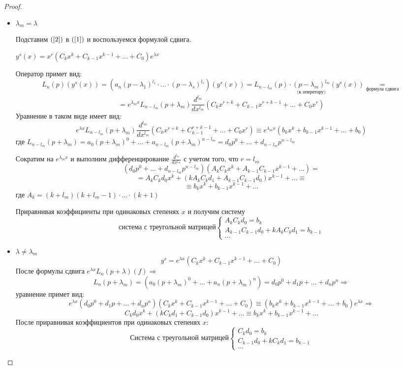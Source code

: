 \begin{proof}
\begin{itemize}
    \item $\lambda_m=\lambda$ \par
    Подставим $(\ref{2})$  в $(\ref{1})$ и воспользуемся формулой сдвига.\par
    $y^s(x)=x^r(C_kx^k+C_{k-1}x^{k-1}+\dots + C_0)e^{\lambda x}$\par
    Оператор примет вид:
    $$L_n(p)(y^s(x))=(a_n(p-\lambda_1)^{l_1}\cdot...\cdot (p-\lambda_s)^{l_s})(y^s(x))=
    L_{n-l_m}(p)\cdot \underset{\text{(к оперетору)}}{(p-\lambda_m)^{l_m}}(y^s(x))\underset{\text{формула сдвига}}{=}
    $$$$=e^{\lambda_m x}L_{n-l_m}(p+\lambda_m)\frac{d^{l_m}}{dx^{l_m}}(C_kx^{r+k}+C_{k-1}x^{r+k-1}+\dots+C_0x^r)$$
    Уравнение в таком виде имеет вид:
    $$e^{\lambda x}L_{n-l_m}(p+\lambda_m)\frac{d^{l_m}}{dx^{l_m}}(C_kx^{r+k}+C_{k-1}^{r+k-1}+\dots+C_0x^r)\equiv e^{\lambda_m x}(b_kx^k+b_{k-1}x^{k-1}+\dots+b_0)$$
    где $L_{n-l_m}(p+\lambda_m)=a_0(p+\lambda_m)^0+\dots+ a_{n-l_m}(p+\lambda_m)^{n-l_m}=d_0p^0+\dots+ d_{n-l_m}p^{n-l_m}$\par
    Сократим на $e^{\lambda_m x}$ и выполним дифференцирование $\frac{d^{l_m}}{dx^{l_m}}$ с учетом того, что $r=l_m$
    $$(d_0p^0+\dots + d_{n-l_m}p^{n-l_m})(A_kC_kx^k+A_{k-1}C_{k-1}x^{k-1}+\dots)=$$
    $$=A_kC_kd_0x^k+(kA_kC_kd_1+A_{k-1}C_{k-1}d_0)x^{k-1}+\dots \equiv$$$$\equiv b_kx^k+b_{k-1}x^{k-1}+\dots$$ где $A_k=(k+l_m)(k+l_m-1)\cdot ... \cdot (k+1)$\par
    Приравнивая коэффициенты при одинаковых степенях $x$ и получим систему 
    \begin{equation}
       \text{система с треугольной матрицей}
        \begin{cases}
            A_kC_kd_0=b_k\\
            A_{k-1}C_{k-1}d_0+kA_kC_kd_1=b_{k-1}\\
            \dots
        \end{cases}
    \end{equation}
    \item $\lambda\neq \lambda_m$
    $$y^s=e^{\lambda x}(C_kx^k+C_{k-1}x^{k-1}+\dots+ C_0)$$
    После формулы сдвига $e^{\lambda x}L_n(p+\lambda)(f)\Rightarrow$
    $$L_n(p+\lambda_m)=(a_0(p+\lambda_m)^0+\dots+a_n(p+\lambda_m)^n)=d_0p^0+d_1p+\dots+d_np^n\Rightarrow$$
    уравнение примет вид:
    $$e^{\lambda x}(d_0p^0+d_1p+\dots+d_np^n)(C_kx^k+C_{k-1}x^{k-1}+\dots+C_0)\equiv (b_kx^k+b_{k-1}x^{k-1}+\dots +b_0)e^{\lambda x}\Rightarrow$$
    $$C_kd_0x^k+(kC_kd_1+C_{k-1}d_0)x^{k-1}+\dots\equiv b_kx^k+b_{k-1}x^{k-1}+\dots$$
    После приравнивая коэффициентов при одинаковых степенях $x$:
    \begin{equation}
    \text{Система с треугольной матрицей}
        \begin{cases}
            C_kd_0=b_k\\
            C_{k-1}d_0+kC_kd_1=b_{k-1}\\
            \dots
        \end{cases}
    \end{equation}
\end{itemize}
\end{proof}
